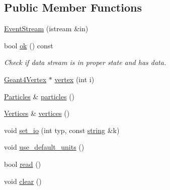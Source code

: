\subsection*{Public Member Functions}
\begin{DoxyCompactItemize}
\item 
\hyperlink{class_d_d4hep_1_1_simulation_1_1_hep_m_c_1_1_event_stream_a73b3cc7b9dee4ad7e9e2dcf17a09e896}{EventStream} (istream \&in)
\item 
bool \hyperlink{class_d_d4hep_1_1_simulation_1_1_hep_m_c_1_1_event_stream_a42014bf4f8f95b2c8b54ec5eede2be61}{ok} () const 
\begin{DoxyCompactList}\small\item\em Check if data stream is in proper state and has data. \item\end{DoxyCompactList}\item 
\hyperlink{class_d_d4hep_1_1_simulation_1_1_geant4_vertex}{Geant4Vertex} $\ast$ \hyperlink{class_d_d4hep_1_1_simulation_1_1_hep_m_c_1_1_event_stream_ac4d60be95873b8933646c17f4a306058}{vertex} (int i)
\item 
\hyperlink{class_d_d4hep_1_1_simulation_1_1_hep_m_c_1_1_event_stream_a99e0260f816229d8ab3ebdd5487b3af1}{Particles} \& \hyperlink{class_d_d4hep_1_1_simulation_1_1_hep_m_c_1_1_event_stream_a5a35867853fd21f0c0cf2754bd568671}{particles} ()
\item 
\hyperlink{class_d_d4hep_1_1_simulation_1_1_hep_m_c_1_1_event_stream_a3e270d38edde8369e52ad396615a2755}{Vertices} \& \hyperlink{class_d_d4hep_1_1_simulation_1_1_hep_m_c_1_1_event_stream_acc8b24a014d6af70e07a6396375692e9}{vertices} ()
\item 
void \hyperlink{class_d_d4hep_1_1_simulation_1_1_hep_m_c_1_1_event_stream_a8c27011e1d7e6ae4b72e763d9253824d}{set\_\-io} (int typ, const \hyperlink{classstd_1_1string}{string} \&k)
\item 
void \hyperlink{class_d_d4hep_1_1_simulation_1_1_hep_m_c_1_1_event_stream_acd5b712fdee97581ee70ce3365b11270}{use\_\-default\_\-units} ()
\item 
bool \hyperlink{class_d_d4hep_1_1_simulation_1_1_hep_m_c_1_1_event_stream_a0a565ef129dd64aae36e05efc29a4be4}{read} ()
\item 
void \hyperlink{class_d_d4hep_1_1_simulation_1_1_hep_m_c_1_1_event_stream_a154b4f2355eac25743ec73982d588c39}{clear} ()
\end{DoxyCompactItemize}
